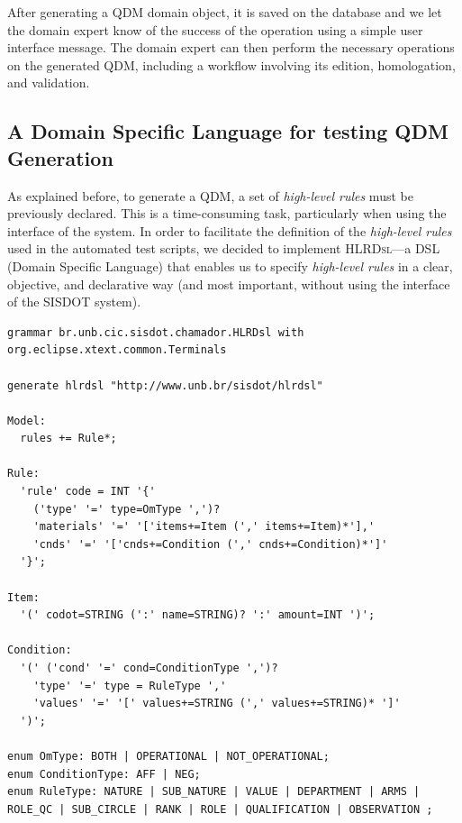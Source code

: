 \documentclass[AMA,STIX1COL]{WileyNJD-v2}
\newcommand{\callers}{\emph{high-level rules}\xspace}
\newcommand{\hlrdsl}{\textsc{HLRDsl}\xspace}
\begin{document}
After generating a QDM domain object, it is saved on the database and we let the domain expert know of the success of the operation using a simple user interface message. The domain expert can then perform the necessary operations on the generated QDM, including a workflow involving  its edition, homologation, and validation.  





\subsection{A Domain Specific Language for testing QDM Generation}

As explained before, to generate a QDM, a set of \callers must be previously declared. This is a time-consuming task, particularly when using the interface of the system. In order to facilitate the definition of the \callers used in the automated test scripts, we decided to implement \hlrdsl---a DSL (Domain Specific Language) that enables us to specify \callers in a clear, objective, and declarative way (and most important, without using the interface of the SISDOT system). 



\begin{lstlisting}[frame=single, float=*t, language=Xtext, caption={\it Xtext grammar defining the DSL structure}, label={code:gramatica}]
grammar br.unb.cic.sisdot.chamador.HLRDsl with org.eclipse.xtext.common.Terminals
        
generate hlrdsl "http://www.unb.br/sisdot/hlrdsl"

Model:
  rules += Rule*;

Rule:
  'rule' code = INT '{'
    ('type' '=' type=OmType ',')?
    'materials' '=' '['items+=Item (',' items+=Item)*'],'
    'cnds' '=' '['cnds+=Condition (',' cnds+=Condition)*']'
  '}';

Item: 
  '(' codot=STRING (':' name=STRING)? ':' amount=INT ')';

Condition:
  '(' ('cond' '=' cond=ConditionType ',')?
    'type' '=' type = RuleType ','
    'values' '=' '[' values+=STRING (',' values+=STRING)* ']'
  ')';

enum OmType: BOTH | OPERATIONAL | NOT_OPERATIONAL;
enum ConditionType: AFF | NEG;
enum RuleType: NATURE | SUB_NATURE | VALUE | DEPARTMENT | ARMS | ROLE_QC | SUB_CIRCLE | RANK | ROLE | QUALIFICATION | OBSERVATION ;
\end{lstlisting}
\end{document}
